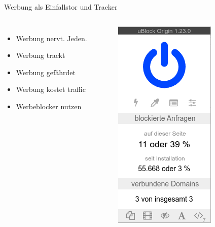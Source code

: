 \documentclass[10pt]{beamer}
\begin{document}
%
%
\begin{frame}[fragile]{Werbung als Einfallstor und Tracker}
\begin{columns}[T,c,onlytextwidth]
\begin{itemize}
    \item Werbung nervt. Jeden.
    \item Werbung trackt
    \item Werbung gefährdet
    \item Werbung kostet traffic
    \item \alert{Werbeblocker nutzen}
  \end{itemize}
	\begin{figure}
		\includegraphics[width=.7\textwidth]{images/ublock}
	\end{figure}
\end{columns}
\end{frame}
\end{document}
